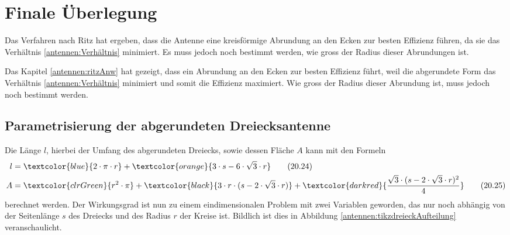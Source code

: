 %
%
% 
%
%
\usetikzlibrary{spy}
\section{Finale Überlegung\label{antennen:resultat}}

Das Verfahren nach Ritz hat ergeben, dass die Antenne eine kreisförmige Abrundung an den Ecken 
zur besten Effizienz führen, da sie das Verhältnis \eqref{antennen:Verhältnis} minimiert. 
Es muss jedoch noch bestimmt werden, wie gross der Radius dieser Abrundungen ist. 

Das Kapitel \ref{antennen:ritzAnw} hat gezeigt, dass ein Abrundung an den Ecken
zur besten Effizienz führt, weil die abgerundete Form das Verhältnis \eqref{antennen:Verhältnis}
minimiert und somit die Effizienz maximiert. Wie gross der Radius dieser Abrundung
ist, muss jedoch noch bestimmt werden.


\subsection{Parametrisierung der abgerundeten Dreiecksantenne\label{antennen:param3eck}}
Die Länge $l$, hierbei der Umfang 
des abgerundeten Dreiecks, sowie dessen Fläche $A$ kann mit den Formeln
\begin{align}
	l &= \textcolor{blue}{2 \cdot \pi \cdot r} + \textcolor{orange}{3 \cdot s - 6 \cdot \sqrt{3} \cdot r} \tag{20.24} \label{antennen:Länge} \\
	A &= \textcolor{clrGreen}{r^2 \cdot \pi} + \textcolor{black}{3 \cdot r \cdot (s - 2 \cdot \sqrt{3} \cdot r)} + \textcolor{darkred}{\frac{\sqrt{3} \cdot (s - 2 \cdot \sqrt{3} \cdot r)^2}{4}} \tag{20.25} \label{antennen:Fläche}
\end{align}\setcounter{equation}{25}
berechnet werden.
Der Wirkungsgrad ist nun zu einem eindimensionalen Problem mit zwei Variablen geworden, das nur noch abhängig von 
der Seitenlänge $s$ des Dreiecks und des Radius $r$ der Kreise ist. Bildlich ist dies 
in Abbildung \ref{antennen:tikzdreieckAufteilung} veranschaulicht.

